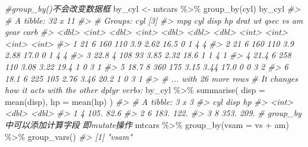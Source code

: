 \documentclass[
]{book}
\newenvironment{Shaded}{\begin{snugshade}}{\end{snugshade}}
\newcommand{\AttributeTok}[1]{\textcolor[rgb]{0.77,0.63,0.00}{#1}}
\newcommand{\CommentTok}[1]{\textcolor[rgb]{0.56,0.35,0.01}{\textit{#1}}}
\newcommand{\FunctionTok}[1]{\textcolor[rgb]{0.00,0.00,0.00}{#1}}
\newcommand{\NormalTok}[1]{#1}
\newcommand{\OtherTok}[1]{\textcolor[rgb]{0.56,0.35,0.01}{#1}}
\newcommand{\SpecialCharTok}[1]{\textcolor[rgb]{0.00,0.00,0.00}{#1}}
\begin{document}
\begin{Shaded}
\begin{Highlighting}[]
\CommentTok{\#group\_by()不会改变数据框}
\NormalTok{by\_cyl }\OtherTok{\textless{}{-}}\NormalTok{ mtcars }\SpecialCharTok{\%\textgreater{}\%} \FunctionTok{group\_by}\NormalTok{(cyl)}
\NormalTok{by\_cyl}
\CommentTok{\#\textgreater{} \# A tibble: 32 x 11}
\CommentTok{\#\textgreater{} \# Groups:   cyl [3]}
\CommentTok{\#\textgreater{}     mpg   cyl  disp    hp  drat    wt  qsec    vs    am  gear  carb}
\CommentTok{\#\textgreater{}   \textless{}dbl\textgreater{} \textless{}int\textgreater{} \textless{}dbl\textgreater{} \textless{}int\textgreater{} \textless{}dbl\textgreater{} \textless{}dbl\textgreater{} \textless{}dbl\textgreater{} \textless{}int\textgreater{} \textless{}int\textgreater{} \textless{}int\textgreater{} \textless{}int\textgreater{}}
\CommentTok{\#\textgreater{} 1  21       6   160   110  3.9   2.62  16.5     0     1     4     4}
\CommentTok{\#\textgreater{} 2  21       6   160   110  3.9   2.88  17.0     0     1     4     4}
\CommentTok{\#\textgreater{} 3  22.8     4   108    93  3.85  2.32  18.6     1     1     4     1}
\CommentTok{\#\textgreater{} 4  21.4     6   258   110  3.08  3.22  19.4     1     0     3     1}
\CommentTok{\#\textgreater{} 5  18.7     8   360   175  3.15  3.44  17.0     0     0     3     2}
\CommentTok{\#\textgreater{} 6  18.1     6   225   105  2.76  3.46  20.2     1     0     3     1}
\CommentTok{\#\textgreater{} \# ... with 26 more rows}
\CommentTok{\# It changes how it acts with the other dplyr verbs:}
\NormalTok{by\_cyl }\SpecialCharTok{\%\textgreater{}\%} \FunctionTok{summarise}\NormalTok{(}
  \AttributeTok{disp =} \FunctionTok{mean}\NormalTok{(disp),}
  \AttributeTok{hp =} \FunctionTok{mean}\NormalTok{(hp)}
\NormalTok{)}
\CommentTok{\#\textgreater{} \# A tibble: 3 x 3}
\CommentTok{\#\textgreater{}     cyl  disp    hp}
\CommentTok{\#\textgreater{}   \textless{}int\textgreater{} \textless{}dbl\textgreater{} \textless{}dbl\textgreater{}}
\CommentTok{\#\textgreater{} 1     4  105.  82.6}
\CommentTok{\#\textgreater{} 2     6  183. 122. }
\CommentTok{\#\textgreater{} 3     8  353. 209.}
\CommentTok{\# group\_by中可以添加计算字段 即mutate操作}
\NormalTok{mtcars }\SpecialCharTok{\%\textgreater{}\%} \FunctionTok{group\_by}\NormalTok{(}\AttributeTok{vsam =}\NormalTok{ vs }\SpecialCharTok{+}\NormalTok{ am) }\SpecialCharTok{\%\textgreater{}\%}
  \FunctionTok{group\_vars}\NormalTok{()}
\CommentTok{\#\textgreater{} [1] "vsam"}
\end{Highlighting}
\end{Shaded}
\end{document}
